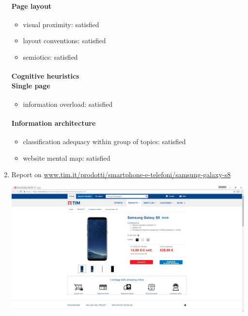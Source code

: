 \begin{enumerate}
	\paragraph*{Page layout}
	\begin{itemize}
		\item visual proximity: satisfied
		\item layout conventions: satisfied
		\item semiotics: satisfied
	\end{itemize}	
	
	\paragraph*{Cognitive heuristics \\ Single page}
	\begin{itemize}
		\item information overload: satisfied
	\end{itemize}	

	\paragraph*{Information architecture}
	\begin{itemize}
		\item classification adequacy within group of topics: satisfied
		\item website mental map: satisfied
	\end{itemize}

\newpage


\item Report on \url{www.tim.it/prodotti/smartphone-e-telefoni/samsung-galaxy-s8}

\begin{center}
	\includegraphics[width=\textwidth]{Screenshot/galaxys8.jpg}
\end{center}
\vspace{1cm}


\end{enumerate}
